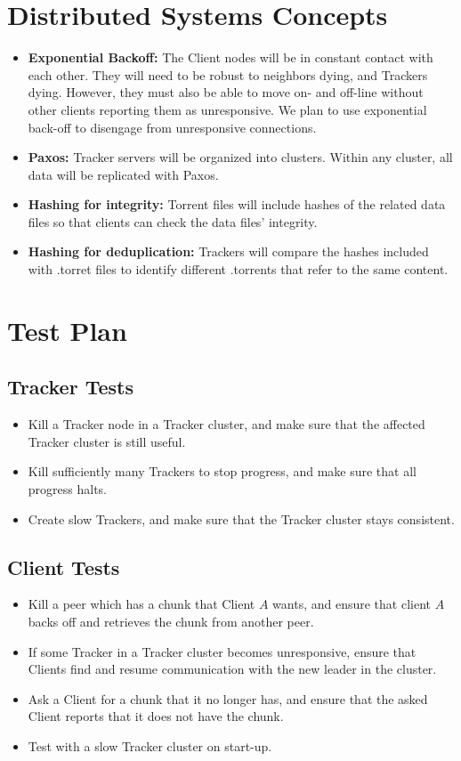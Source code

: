 \documentclass[12pt]{article}
\begin{document}
\section*{Distributed Systems Concepts}

\begin{itemize}
\item \textbf{Exponential Backoff:} The Client nodes will be in constant
contact with each other.
They will need to be robust to neighbors dying, and Trackers dying.
However, they must also be able to move on- and off-line without other clients
reporting them as unresponsive.
We plan to use exponential back-off to disengage from unresponsive connections.
\item \textbf{Paxos:} Tracker servers will be organized into clusters.
Within any cluster, all data will be replicated with Paxos.
\item \textbf{Hashing for integrity:} Torrent files will include hashes of the related data files so that clients can check the data files' integrity.
\item \textbf{Hashing for deduplication:} Trackers will compare the hashes included with .torret files to identify different .torrents that refer to the same content.
\end{itemize}

\section*{Test Plan}

\subsection*{Tracker Tests}
\begin{itemize}
\item  Kill a Tracker node in a Tracker cluster,
       and make sure that the affected Tracker cluster is still useful.
\item  Kill sufficiently many Trackers to stop progress,
       and make sure that all progress halts.
\item  Create slow Trackers,
       and make sure that the Tracker cluster stays consistent.
\end{itemize}

\subsection*{Client Tests}
\begin{itemize}
\item  Kill a peer which has a chunk that Client $A$ wants, and ensure that
       client $A$ backs off and retrieves the chunk from another peer.
\item  If some Tracker in a Tracker cluster becomes unresponsive, ensure that
       Clients find and resume communication with the new leader in the cluster.
\item  Ask a Client for a chunk that it no longer has, and ensure that the asked
       Client reports that it does not have the chunk.
\item  Test with a slow Tracker cluster on start-up.
\end{itemize}
\end{document}
